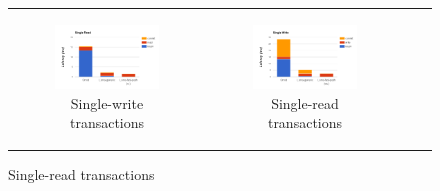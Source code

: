 \begin{figure}
  \centering
  \begin{tabular}{cccc}
    
  \begin{subfigure}[t]{0.4\textwidth}
	\includegraphics[width=\textwidth]{figs/stack-brc.png}
	\caption[]{Single-write transactions}
    \label{fig:stack-brc}
  \end{subfigure} &

  \begin{subfigure}[t]{0.4\textwidth}
	\includegraphics[width=\textwidth]{figs/stack-bwc.png}
	\caption[]{Single-read transactions}
    \label{fig:stack-bwc}
  \end{subfigure} \\


\end{tabular}
\end{figure}
